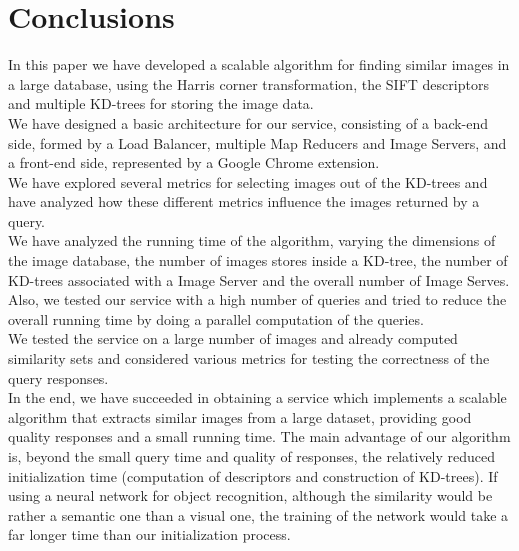 \chapter{Conclusions}

In this paper we have developed a scalable algorithm for finding similar images in a large database, using the Harris corner transformation, the SIFT descriptors and multiple KD-trees for storing the image data.\\
We have designed a basic architecture for our service, consisting of a back-end side, formed by a Load Balancer, multiple Map Reducers and Image Servers, and a front-end side, represented by a Google Chrome extension.\\
We have explored several metrics for selecting images out of the KD-trees and have analyzed how these different metrics influence the images returned by a query.\\
We have analyzed the running time of the algorithm, varying the dimensions of the image database, the number of images stores inside a KD-tree, the number of KD-trees associated with a Image Server and the overall number of Image Serves. Also, we tested our service with a high number of queries and tried to reduce the overall running time by doing a parallel computation of the queries.\\
We tested the service on a large number of images and already computed similarity sets and considered various metrics for testing the correctness of the query responses.\\
In the end, we have succeeded in obtaining a service which implements a scalable algorithm that extracts similar images from a large dataset, providing good quality responses and a small running time. The main advantage of our algorithm is, beyond the small query time and quality of responses, the relatively reduced initialization time (computation of descriptors and construction of KD-trees). If using a neural network for object recognition, although the similarity would be rather a semantic one than a visual one, the training of the network would take a far longer time than our initialization process.

